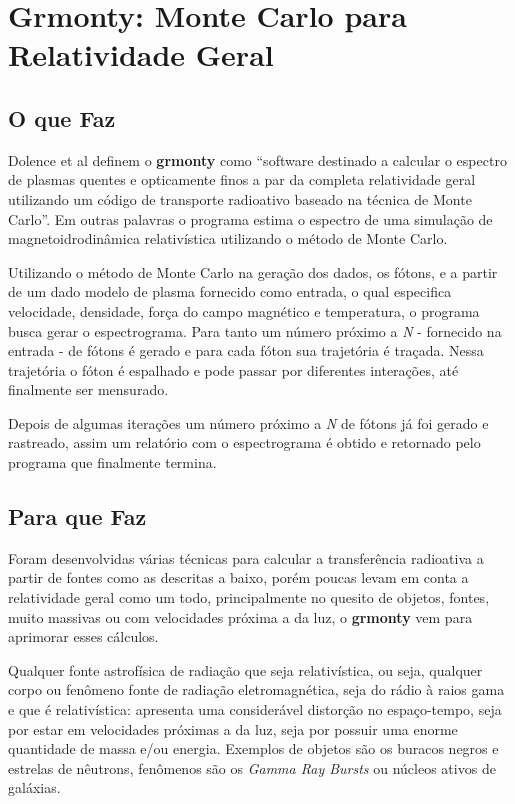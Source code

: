 \chapter{Grmonty: Monte Carlo para Relatividade Geral}
\label{cap:grmonty}

\section{O que Faz}
  Dolence et al definem o \textbf{grmonty} como ``software destinado a calcular o espectro de plasmas quentes e opticamente finos a par da completa relatividade geral utilizando um código de transporte radioativo baseado na técnica de Monte Carlo''\citep[p.1, traduzido]{Dolence:09}. Em outras palavras o programa estima o espectro de uma simulação de magnetoidrodinâmica \cite{eletro-hidro-dynamic} relativística utilizando o método de Monte Carlo.

  Utilizando o método de Monte Carlo na geração dos dados, os fótons, e a partir de um dado modelo de plasma fornecido como entrada, o qual especifica velocidade, densidade, força do campo magnético e temperatura, o programa busca gerar o espectrograma. Para tanto um número próximo a \textit{N} - fornecido na entrada - de fótons é gerado e para cada fóton sua trajetória é traçada. Nessa trajetória o fóton é espalhado e pode passar por diferentes interações, até finalmente ser mensurado.

  Depois de algumas iterações um número próximo a \textit{N} de fótons já foi gerado e rastreado, assim um relatório com o espectrograma é obtido e retornado pelo programa que finalmente termina.

\section{Para que Faz}
  Foram desenvolvidas várias técnicas para calcular a transferência radioativa a partir de fontes como as descritas a baixo\citep{Dolence:09}, porém poucas levam em conta a relatividade geral como um todo, principalmente no quesito de objetos, fontes, muito massivas ou com velocidades próxima a da luz, o \textbf{grmonty} vem para aprimorar esses cálculos.

  Qualquer fonte astrofísica de radiação que seja relativística, ou seja, qualquer corpo ou fenômeno fonte de radiação eletromagnética, seja do rádio à raios gama e que é relativística: apresenta uma considerável distorção no espaço-tempo, seja por estar em velocidades próximas a da luz, seja por possuir uma enorme quantidade de massa e/ou energia. Exemplos de objetos são os buracos negros e estrelas de nêutrons, fenômenos são os \textit{Gamma Ray Bursts} ou núcleos ativos de galáxias.


